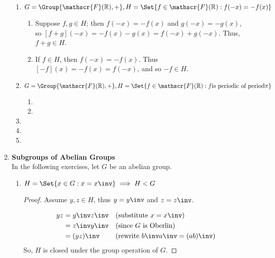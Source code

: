 \begin{enumerate}[label={\Alph*.},font={\bfseries}]
\begin{enumerate}[label={\arabic*},font={\bfseries}]
  \item $G = \Group{\mathscr{F}(\mathbb{R}), +}, H = \Set{f \in \mathscr{F}(\mathbb{R}) : f(-x) = -f(x)}$
    \begin{enumerate}[label={(\roman*)}]
    \item Suppose $f,g \in H$; then $f(-x) = -f(x)$ and $g(-x) = -g(x)$, so $[f+g](-x) = -f(x) - g(x) = f(-x) + g(-x)$. Thus, $f + g \in H$.
    \item If $f \in H$, then $f(-x) = -f(x)$. Thus $[-f](x) = -f(x) = f(-x)$, and so $-f \in H$.
    \end{enumerate}
  \item $G = \Group{\mathscr{F}(\mathbb{R}), +}, H = \Set{f \in \mathscr{F}(\mathbb{R}) : f \text{is periodic of period} \pi}$
    \begin{enumerate}[label={(\roman*)}]
    \item {}
    \item {}
    \end{enumerate}
  \item {}
  \item {}
  \item {}
  \end{enumerate}
\item {\bf Subgroups of Abelian Groups} \\
  In the following exercises, let $G$ be an abelian group.
  \begin{enumerate}[label={\arabic*},font={\bfseries}]
  \item
    \begin{theorem}
      $H = \Set{x \in G : x = x\inv} \implies H < G$
    \end{theorem}
    \begin{proof}
      Assume $y, z \in H$, thus $y = y\inv$ and $z = z\inv$.

      \begin{align*}
        yz &= {y\inv}{z\inv} && \text{(substitute $x = x\inv$)} \\
        &= {z\inv}{y\inv} && \text{(since $G$ is Oberlin)}\\
        &= (yz)\inv && \text{(rewrite ${b\inv}{a\inv} = (ab)\inv$)}
      \end{align*}
      So, $H$ is closed under the group operation of $G$.


\end{proof}
\end{enumerate}
\end{enumerate}
